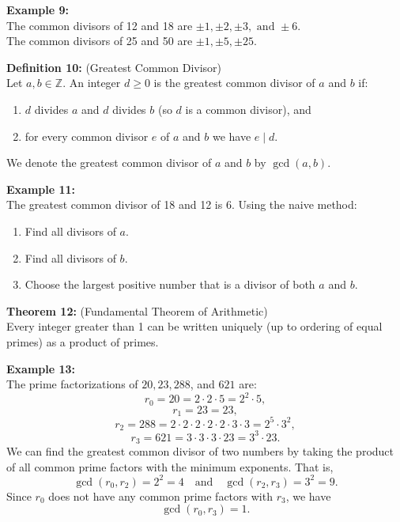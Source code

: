 \documentclass[12pt]{article}
\begin{document}
\vspace{5mm}

\noindent\textbf{Example 9:}
\label{ex:commondvs}
\\The common divisors of 12 and 18 are $\pm1, \pm2, \pm3, \text{ and } \pm6$.
\\The common divisors of 25 and 50 are $\pm1, \pm5, \pm25$.

\vspace{5mm}

\noindent\textbf{Definition 10:} (Greatest Common Divisor)
\label{def:gcd}
\\Let $a,b \in \mathbb{Z}$. An integer $d\ge 0$ is the greatest common divisor of $a$ and $b$ if:
\begin{enumerate}
    \item $d$ divides $a$ and $d$ divides $b$ (so $d$ is a common divisor), and
    \item for every common divisor $e$ of $a$ and $b$ we have $e \mid d$.
\end{enumerate}
We denote the greatest common divisor of $a$ and $b$ by $\gcd(a,b)$.

\vspace{5mm}

\noindent\textbf{Example 11:}
\label{ex:gcdnaive}
\\The greatest common divisor of 18 and 12 is 6. Using the naive method: 
\begin{enumerate}
    \item Find all divisors of $a$.
    \item Find all divisors of $b$.
    \item Choose the largest positive number that is a divisor of both $a$ and $b$.
\end{enumerate}

\vspace{5mm}

\noindent\textbf{Theorem 12:} (Fundamental Theorem of Arithmetic)
\label{thm:fta}
\\Every integer greater than 1 can be written uniquely (up to ordering of equal primes) as a product of primes.

\vspace{5mm}

\noindent\textbf{Example 13:}
\label{ex:primefact}
\\The prime factorizations of $20, 23, 288$, and $621$ are:
\[
r_0 = 20 = 2 \cdot 2 \cdot 5 = 2^2 \cdot 5,
\]
\[
r_1 = 23 = 23,
\]
\[
r_2 = 288 = 2 \cdot 2 \cdot 2 \cdot 2 \cdot 2 \cdot 3 \cdot 3 = 2^5 \cdot 3^2,
\]
\[
r_3 = 621 = 3 \cdot 3 \cdot 3 \cdot 23 = 3^3 \cdot 23.
\]
We can find the greatest common divisor of two numbers by taking the product of all common prime factors with the minimum exponents. That is, 
\[
\gcd(r_0, r_2) = 2^2 = 4 \quad \text{and} \quad \gcd(r_2, r_3) = 3^2 = 9.
\]
Since \(r_0\) does not have any common prime factors with \(r_3\), we have
\[
\gcd(r_0, r_3) = 1.
\]
\end{document}
